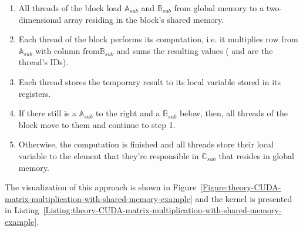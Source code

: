 \begin{enumerate}
	\item All threads of the block load $ \mathbb{A}_{sub} $ and $ \mathbb{B}_{sub} $ from global memory to a two-dimensional array residing in the block's shared memory.
	\item Each thread of the block performs its computation, i.e. it multiplies row  from\space $ \mathbb{A}_{sub} $ with column  from$ \mathbb{B}_{sub} $ and sums the resulting values ( and  are the thread's IDs).
	\item Each thread stores the temporary result to its local variable  stored in its registers.
	\item If there still is a $ \mathbb{A}_{sub} $ to the right and a $ \mathbb{B}_{sub} $ below, then, all threads of the block move to them and continue to step 1.
	\item Otherwise, the computation is finished and all threads store their local variable  to the element that they're responsible  in $ \mathbb{C}_{sub} $ that resides in global memory.
\end{enumerate}

The visualization of this approach is shown in Figure~\ref{Figure:theory-CUDA-matrix-multiplication-with-shared-memory-example} and the kernel is presented in Listing~\ref{Listing:theory-CUDA-matrix-multiplication-with-shared-memory-example}.

